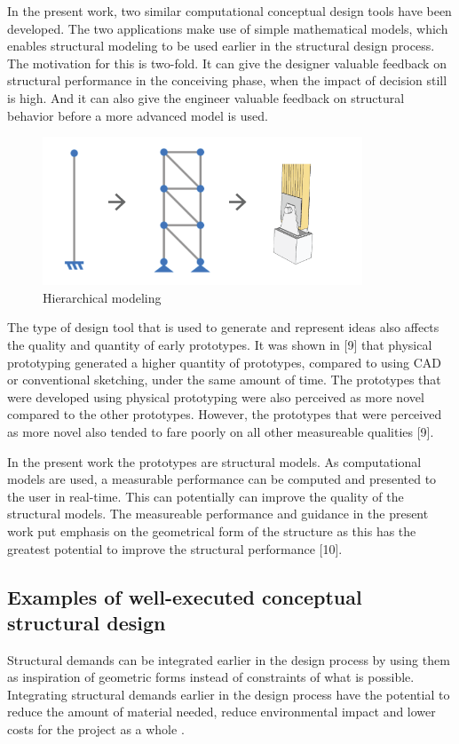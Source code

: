 In the present work, two similar computational conceptual design tools have been developed. The two applications make use of simple mathematical models, which enables structural modeling to be used earlier in the structural design process. The motivation for this is two-fold. It can give the designer valuable feedback on structural performance in the conceiving phase, when the impact of decision still is high. And it can also give the engineer valuable feedback on structural behavior before a more advanced model is used. 

\begin{figure}
  \includegraphics[width=270pt]{graphics/hiarchical-modelling.png}
  \caption{Hierarchical modeling}
  \label{fig:hiarchical-modelling}
\end{figure}

The type of design tool that is used to generate and represent ideas also affects the quality and quantity of early prototypes. It was shown in [9] that physical prototyping generated a higher quantity of prototypes, compared to using CAD or conventional sketching, under the same amount of time. The prototypes that were developed using physical prototyping were also perceived as more novel compared to the other prototypes. However, the prototypes that were perceived as more novel also tended to fare poorly on all other measureable qualities [9]. 

In the present work the prototypes are structural models. As computational models are used, a measurable performance can be computed and presented to the user in real-time. This can potentially can improve the quality of the structural models. The measureable performance and guidance in the present work put emphasis on the geometrical form of the structure as this has the greatest potential to improve the structural performance [10]. 

\subsection{Examples of well-executed conceptual structural design}
Structural demands can be integrated earlier in the design process by using them as inspiration of geometric forms instead of constraints of what is possible. Integrating structural demands earlier in the design process have the potential to reduce the amount of material needed, reduce environmental impact and lower costs for the project as a whole \cite{Mueller2014}. 

